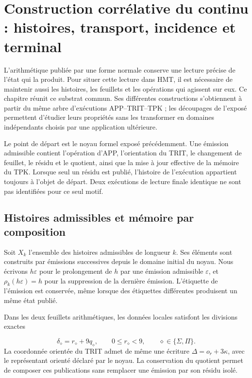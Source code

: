 \section{Construction corrélative du continu : histoires, transport, incidence et terminal}
\label{viii:lectura:manuscrito-05}
L'arithmétique publiée par une forme normale conserve une lecture précise de l'état qui la produit. Pour situer cette lecture dans HMT, il est nécessaire de maintenir aussi les histoires, les feuillets et les opérations qui agissent sur eux. Ce chapitre réunit ce substrat commun. Ses différentes constructions s'obtiennent à partir du même arbre d'exécutions APP–TRIT–TPK ; les découpages de l'exposé permettent d'étudier leurs propriétés sans les transformer en domaines indépendants choisis par une application ultérieure.

Le point de départ est le noyau formel exposé précédemment. Une émission admissible contient l'opération d'APP, l'orientation du TRIT, le changement de feuillet, le résidu et le quotient, ainsi que la mise à jour effective de la mémoire du TPK. Lorsque seul un résidu est publié, l'histoire de l'exécution appartient toujours à l'objet de départ. Deux exécutions de lecture finale identique ne sont pas identifiées pour ce seul motif.

\subsection{Histoires admissibles et mémoire par composition}
Soit \(X_k\) l’ensemble des histoires admissibles de longueur \(k\). Ses éléments sont construits par émissions successives depuis le domaine initial du noyau. Nous écrivons \(h\varepsilon\) pour le prolongement de \(h\) par une émission admissible \(\varepsilon\), et \(\rho_k(h\varepsilon)=h\) pour la suppression de la dernière émission. L’étiquette de l’émission est conservée, même lorsque des étiquettes différentes produisent un même état publié.

Dans les deux feuillets arithmétiques, les données locales satisfont les divisions exactes

\[
\delta_\diamond=r_\diamond+9q_\diamond,
\qquad 0\leq r_\diamond<9,
\qquad \diamond\in\{\Sigma,\Pi\}.
\]
La coordonnée orientée du TRIT admet de même une écriture \(\Delta=o_r+3\kappa\), avec le représentant orienté déclaré par le noyau. La conservation du quotient permet de composer ces publications sans remplacer une émission par son résidu isolé.

